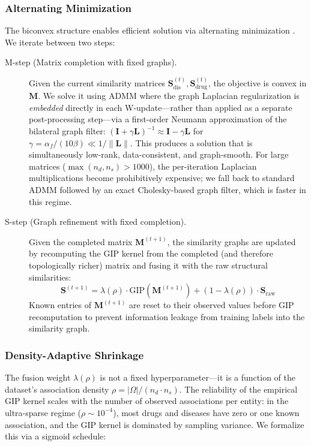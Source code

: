 \documentclass{oup-authoring-template}
\begin{document}
\subsubsection{Alternating Minimization}

The biconvex structure enables efficient solution via alternating minimization \cite{tseng2001}. We iterate between two steps:

\begin{description}
    \item[M-step (Matrix completion with fixed graphs).] Given the current similarity matrices $\mathbf{S}_{\text{dis}}^{(t)}, \mathbf{S}_{\text{drug}}^{(t)}$, the objective is convex in $\mathbf{M}$. We solve it using ADMM where the graph Laplacian regularization is \emph{embedded} directly in each W-update---rather than applied as a separate post-processing step---via a first-order Neumann approximation of the bilateral graph filter: $(\mathbf{I} + \gamma\mathbf{L})^{-1} \approx \mathbf{I} - \gamma\mathbf{L}$ for $\gamma = \alpha_f / (10\beta) \ll 1 / \|\mathbf{L}\|$. This produces a solution that is simultaneously low-rank, data-consistent, and graph-smooth. For large matrices ($\max(n_d, n_s) > 1000$), the per-iteration Laplacian multiplications become prohibitively expensive; we fall back to standard ADMM followed by an exact Cholesky-based graph filter, which is faster in this regime.

    \item[S-step (Graph refinement with fixed completion).] Given the completed matrix $\mathbf{M}^{(t+1)}$, the similarity graphs are updated by recomputing the GIP kernel from the completed (and therefore topologically richer) matrix and fusing it with the raw structural similarities:
    \begin{equation}
    \mathbf{S}^{(t+1)} = \lambda(\rho) \cdot \text{GIP}(\mathbf{M}^{(t+1)}) + (1 - \lambda(\rho)) \cdot \mathbf{S}_{\text{raw}}
    \label{eq:s_step}
    \end{equation}
    Known entries of $\mathbf{M}^{(t+1)}$ are reset to their observed values before GIP recomputation to prevent information leakage from training labels into the similarity graph.
\end{description}

\subsubsection{Density-Adaptive Shrinkage}

The fusion weight $\lambda(\rho)$ is not a fixed hyperparameter---it is a function of the dataset's association density $\rho = |\Omega| / (n_d \cdot n_s)$. The reliability of the empirical GIP kernel scales with the number of observed associations per entity: in the ultra-sparse regime ($\rho \sim 10^{-4}$), most drugs and diseases have zero or one known association, and the GIP kernel is dominated by sampling variance. We formalize this via a sigmoid schedule:
\end{document}
